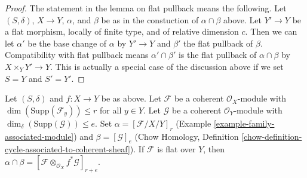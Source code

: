 \begin{proof}
\medskip\noindent
The statement in the lemma on flat pullback means the following.
Let $(S, \delta)$, $X \to Y$, $\alpha$, and $\beta$ be as in the
constuction of $\alpha \cap \beta$ above. Let $Y' \to Y$ be a flat
morphism, locally of finite type, and of relative dimension $c$. Then
we can let $\alpha'$ be the base change of $\alpha$ by $Y' \to Y$
and $\beta'$ the flat pullback of $\beta$. Compatibility with flat
pullback means $\alpha' \cap \beta'$ is the flat pullback of
$\alpha \cap \beta$ by $X \times_Y Y' \to Y$. This is actually
a special case of the discussion above if we set $S = Y$ and $S' = Y'$.
\end{proof}

\begin{lemma}
\label{lemma-action-coherent}
Let $(S, \delta)$ and $f : X \to Y$ be as above.
Let $\mathcal{F}$ be a coherent $\mathcal{O}_X$-module
with $\dim(\text{Supp}(\mathcal{F}_y)) \leq r$ for all $y \in Y$.
Let $\mathcal{G}$ be a coherent $\mathcal{O}_Y$-module
with $\dim_\delta(\text{Supp}(\mathcal{G})) \leq e$.
Set $\alpha = [\mathcal{F}/X/Y]_r$
(Example \ref{example-family-associated-module}) and
$\beta = [\mathcal{G}]_e$ (Chow Homology, Definition
\ref{chow-definition-cycle-associated-to-coherent-sheaf}).
If $\mathcal{F}$ is flat over $Y$, then $\alpha \cap \beta =
[\mathcal{F} \otimes_{\mathcal{O}_X} f^*\mathcal{G}]_{r + e}$.
\end{lemma}

